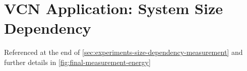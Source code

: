 \begin{minipage}{\textwidth}
    \section{VCN Application: System Size Dependency}
        \label{appendix:vcn-system-size-dependency}
        Referenced at the end of \autoref{sec:experiments-size-dependency-measurement} and further details in \autoref{fig:final-measurement-energy}\\
        \vbox{
        }
\end{minipage}
\newpage
\begin{minipage}{\textwidth}
    \vbox{
    }
\end{minipage}

